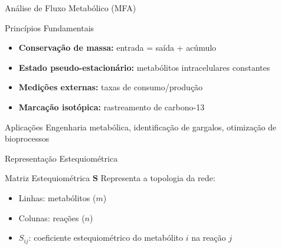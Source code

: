 \begin{frame}{Análise de Fluxo Metabólico (MFA)}

\vspace{0.3cm}

\begin{block}{Princípios Fundamentais}
\begin{itemize}
    \item \textbf{Conservação de massa:} entrada = saída + acúmulo
    \item \textbf{Estado pseudo-estacionário:} metabólitos intracelulares constantes
    \item \textbf{Medições externas:} taxas de consumo/produção
    \item \textbf{Marcação isotópica:} rastreamento de carbono-13
\end{itemize}
\end{block}

\begin{exampleblock}{Aplicações}
Engenharia metabólica, identificação de gargalos, otimização de bioprocessos
\end{exampleblock}
\end{frame}

\begin{frame}{Representação Estequiométrica}
\begin{block}{Matriz Estequiométrica $\mathbf{S}$}
Representa a topologia da rede:
\begin{itemize}
    \item Linhas: metabólitos ($m$)
    \item Colunas: reações ($n$)
    \item $S_{ij}$: coeficiente estequiométrico do metabólito $i$ na reação $j$
\end{itemize}
\end{block}

\end{frame}

